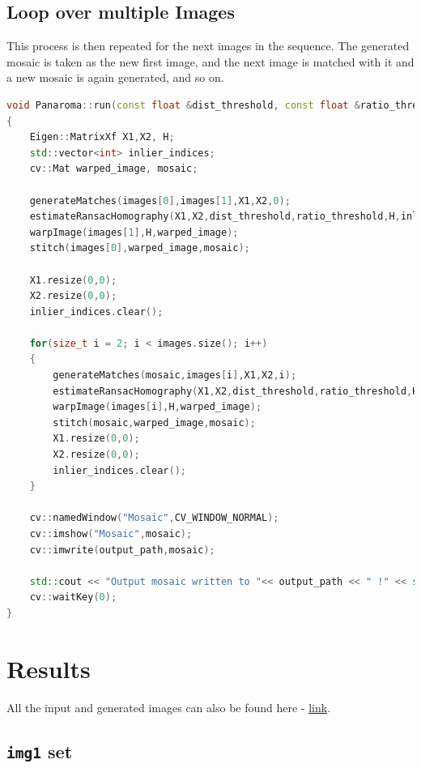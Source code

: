 \documentclass[a4paper,11]{article}
\begin{document}
  \subsection{Loop over multiple Images}
  
  This process is then repeated for the next images in the sequence. The generated mosaic is taken as the new first image, and the next image is matched with it and a new mosaic is again generated, and so on.
   
    \begin{lstlisting}[language=C++]
void Panaroma::run(const float &dist_threshold, const float &ratio_threshold)
{
	Eigen::MatrixXf X1,X2, H;
    std::vector<int> inlier_indices;
    cv::Mat warped_image, mosaic;

	generateMatches(images[0],images[1],X1,X2,0);
   	estimateRansacHomography(X1,X2,dist_threshold,ratio_threshold,H,inlier_indices);
   	warpImage(images[1],H,warped_image);
 	stitch(images[0],warped_image,mosaic);

	X1.resize(0,0);
	X2.resize(0,0);
	inlier_indices.clear();

	for(size_t i = 2; i < images.size(); i++)
	{
		generateMatches(mosaic,images[i],X1,X2,i);
   		estimateRansacHomography(X1,X2,dist_threshold,ratio_threshold,H,inlier_indices);
	   	warpImage(images[i],H,warped_image);
 		stitch(mosaic,warped_image,mosaic);
		X1.resize(0,0);
		X2.resize(0,0);
		inlier_indices.clear();
	}

	cv::namedWindow("Mosaic",CV_WINDOW_NORMAL);
	cv::imshow("Mosaic",mosaic);
	cv::imwrite(output_path,mosaic);

	std::cout << "Output mosaic written to "<< output_path << " !" << std::endl;
    cv::waitKey(0);
}
    \end{lstlisting}
    \vspace{2em}
   
  
\section{Results}
All the input and generated images can also be found here - \href{https://drive.google.com/drive/folders/1yWDCrjAzcIT8lY5YrfEgnE_MRmjcgCXH?usp=sharing}{link}.
  \subsection{\texttt{img1} set}
  
\end{document}
